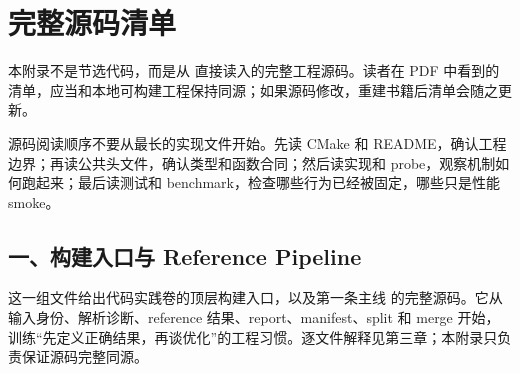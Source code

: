 \chapter*{完整源码清单}

本附录不是节选代码，而是从  直接读入的完整工程源码。读者在 PDF 中看到的清单，应当和本地可构建工程保持同源；如果源码修改，重建书籍后清单会随之更新。

源码阅读顺序不要从最长的实现文件开始。先读 CMake 和 README，确认工程边界；再读公共头文件，确认类型和函数合同；然后读实现和 probe，观察机制如何跑起来；最后读测试和 benchmark，检查哪些行为已经被固定，哪些只是性能 smoke。

\section*{一、构建入口与 Reference Pipeline}

这一组文件给出代码实践卷的顶层构建入口，以及第一条主线  的完整源码。它从输入身份、解析诊断、reference 结果、report、manifest、split 和 merge 开始，训练“先定义正确结果，再谈优化”的工程习惯。逐文件解释见第三章；本附录只负责保证源码完整同源。



















